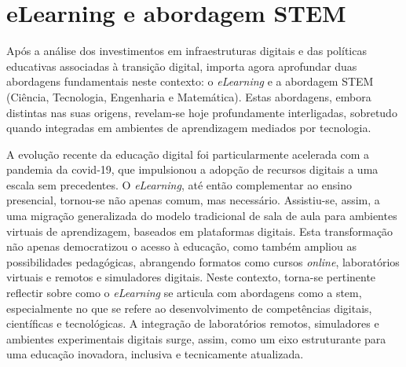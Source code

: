 \section{eLearning e abordagem STEM} %
\label{sec:elearningstem}	%

Após a análise dos investimentos em infraestruturas digitais e das políticas educativas associadas à transição digital, importa agora aprofundar duas abordagens fundamentais neste contexto: o \textit{eLearning} e a abordagem STEM (Ciência, Tecnologia, Engenharia e Matemática). Estas abordagens, embora distintas nas suas origens, revelam-se hoje profundamente interligadas, sobretudo quando integradas em ambientes de aprendizagem mediados por tecnologia.

A evolução recente da educação digital foi particularmente acelerada com a pandemia da \acrshort{covid-19}, que impulsionou a adopção de recursos digitais a uma escala sem precedentes. O \textit{eLearning}, até então complementar ao ensino presencial, tornou-se não apenas comum, mas necessário. Assistiu-se, assim, a uma migração generalizada do modelo tradicional de sala de aula para ambientes virtuais de aprendizagem, baseados em plataformas digitais. Esta transformação não apenas democratizou o acesso à educação, como também ampliou as possibilidades pedagógicas, abrangendo formatos como cursos \textit{online}, laboratórios virtuais e remotos e simuladores digitais. Neste contexto, torna-se pertinente reflectir sobre como o \textit{eLearning} se articula com abordagens como a \acrshort{stem}, especialmente no que se refere ao desenvolvimento de competências digitais, científicas e tecnológicas. A integração de laboratórios remotos, simuladores e ambientes experimentais digitais surge, assim, como um eixo estruturante para uma educação inovadora, inclusiva e tecnicamente atualizada.

